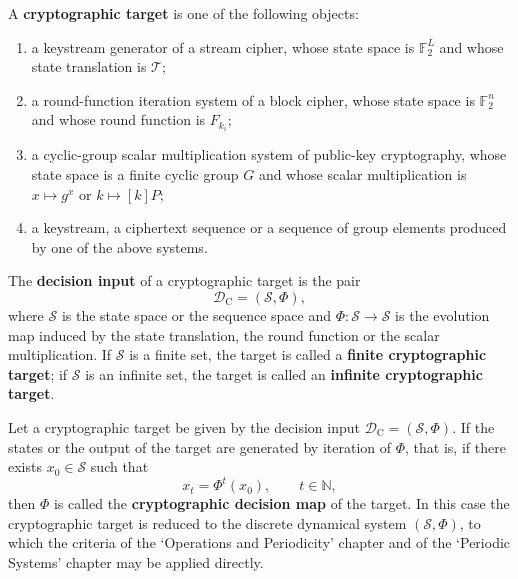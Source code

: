 \begin{definition}\label{def:crypto_target}
A \textbf{cryptographic target} is one of the following objects:
\begin{enumerate}[label=(\roman*)]
    \item a keystream generator of a stream cipher, whose state space is \(\mathbb F_2^L\) and whose state translation is \(\mathcal T\);
    \item a round-function iteration system of a block cipher, whose state space is \(\mathbb F_2^n\) and whose round function is \(F_{k_i}\);
    \item a cyclic-group scalar multiplication system of public-key cryptography, whose state space is a finite cyclic group \(G\) and whose scalar multiplication is \(x\mapsto g^x\) or \(k\mapsto [k]P\);
    \item a keystream, a ciphertext sequence or a sequence of group elements produced by one of the above systems.
\end{enumerate}
The \textbf{decision input} of a cryptographic target is the pair
\[
\mathcal D_{\mathrm{C}}=(\mathcal S,\Phi),
\]
where \(\mathcal S\) is the state space or the sequence space and \(\Phi:\mathcal S\to\mathcal S\) is the evolution map induced by the state translation, the round function or the scalar multiplication. If \(\mathcal S\) is a finite set, the target is called a \textbf{finite cryptographic target}; if \(\mathcal S\) is an infinite set, the target is called an \textbf{infinite cryptographic target}.
\end{definition}

\begin{definition}\label{def:crypto_periodization}
Let a cryptographic target be given by the decision input \(\mathcal D_{\mathrm{C}}=(\mathcal S,\Phi)\). If the states or the output of the target are generated by iteration of \(\Phi\), that is, if there exists \(x_0\in\mathcal S\) such that
\[
x_t=\Phi^t(x_0),\qquad t\in\mathbb N,
\]
then \(\Phi\) is called the \textbf{cryptographic decision map} of the target. In this case the cryptographic target is reduced to the discrete dynamical system \((\mathcal S,\Phi)\), to which the criteria of the `Operations and Periodicity' chapter and of the `Periodic Systems' chapter may be applied directly.
\end{definition}

